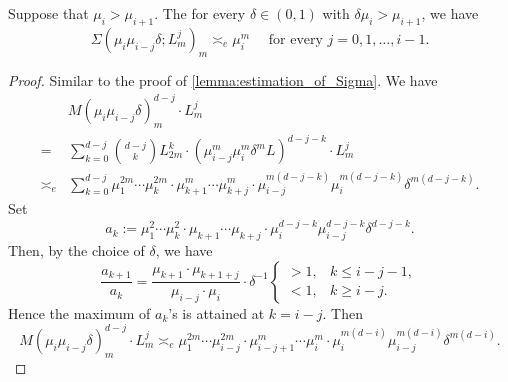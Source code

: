   \begin{lemma}\label{lem:growth_of_sigma_L_m}
    Suppose that $\mu_i > \mu_{i+1}$.
    The for every $\delta \in (0, 1)$ with $\delta \mu_i > \mu_{i+1}$, we have 
    \[ \Sigma(\mu_i \mu_{i-j} \delta; L_m^j)_m \asymp_e \mu_i^m \quad \text{ for every } j = 0, 1, \ldots, i-1. \]
  \end{lemma}
  \begin{proof}
    Similar to the proof of \cref{lemma:estimation_of_Sigma}.
    We have 
    \begin{align*}
      & M(\mu_i \mu_{i-j} \delta)_m^{d-j} \cdot L_m^{j} \\
      = & \sum_{k=0}^{d-j} \binom{d-j}{k} L_{2m}^{k} \cdot (\mu_{i-j}^m \mu_i^m \delta^m L)^{d-j-k} \cdot L_m^{j} \\
      \asymp_e & \sum_{k=0}^{d-j} \mu_1^{2m} \cdots \mu_k^{2m} \cdot \mu_{k+1}^m \cdots \mu_{k+j}^m \cdot \mu_{i-j}^{m(d-j-k)} \mu_i^{m(d-j-k)} \delta^{m(d-j-k)}.
    \end{align*}
    Set
    \[ a_k := \mu_1^2 \cdots \mu_k^2 \cdot \mu_{k+1} \cdots \mu_{k+j} \cdot \mu_i^{d-j-k} \mu_{i-j}^{d-j-k} \delta^{d-j-k}. \]
    Then, by the choice of $\delta$, we have
    \begin{equation}\label{eq:ratio_of_a_k_in_estimation_of_Sigma_and_setting_of_delta}
      \frac{a_{k+1}}{a_k} = \frac{\mu_{k+1} \cdot \mu_{k+1+j}}{\mu_{i-j} \cdot \mu_i} \cdot \delta^{-1} \begin{cases}
        > 1, & k \leq i-j-1, \\
        < 1, & k \geq i-j .
      \end{cases}
    \end{equation}
    Hence the maximum of $a_k$'s is attained at $k = i-j$.
    Then 
    \begin{equation}\label{eq:estimation_of_numerator_in_Sigma_L_m_in_lemma}
      M(\mu_i \mu_{i-j} \delta)_m^{d-j} \cdot L_m^{j} \asymp_e \mu_1^{2m} \cdots \mu_{i-j}^{2m} \cdot \mu_{i-j+1}^m \cdots \mu_{i}^m \cdot \mu_i^{m(d-i)} \mu_{i-j}^{m(d-i)} \delta^{m(d-i)}.
    \end{equation}


\end{proof}
